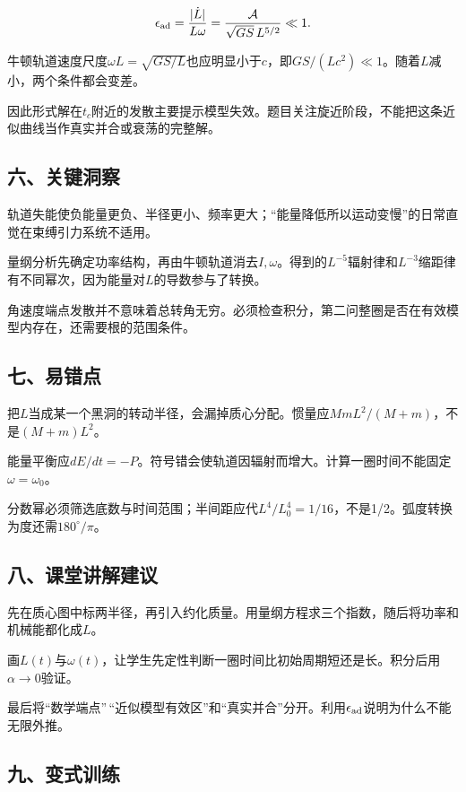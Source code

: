 \documentclass[12pt,a4paper,fontset=fandol]{ctexart}
\begin{document}
\[
\epsilon_{\rm ad}
=\frac{|\dot L|}{L\omega}
=\frac{\mathcal A}{\sqrt{GS}\,L^{5/2}}\ll1.
\]

牛顿轨道速度尺度\(\omega L=\sqrt{GS/L}\)也应明显小于\(c\)，即\(GS/(Lc^2)\ll1\)。随着\(L\)减小，两个条件都会变差。

因此形式解在\(t_c\)附近的发散主要提示模型失效。题目关注旋近阶段，不能把这条近似曲线当作真实并合或衰荡的完整解。

\subsection{六、关键洞察}\label{ux516dux5173ux952eux6d1eux5bdf-6}

轨道失能使负能量更负、半径更小、频率更大；``能量降低所以运动变慢''的日常直觉在束缚引力系统不适用。

量纲分析先确定功率结构，再由牛顿轨道消去\(I,\omega\)。得到的\(L^{-5}\)辐射律和\(L^{-3}\)缩距律有不同幂次，因为能量对\(L\)的导数参与了转换。

角速度端点发散并不意味着总转角无穷。必须检查积分，第二问整圈是否在有效模型内存在，还需要根的范围条件。

\subsection{七、易错点}\label{ux4e03ux6613ux9519ux70b9-6}

把\(L\)当成某一个黑洞的转动半径，会漏掉质心分配。惯量应\(MmL^2/(M+m)\)，不是\((M+m)L^2\)。

能量平衡应\(dE/dt=-P\)。符号错会使轨道因辐射而增大。计算一圈时间不能固定\(\omega=\omega_0\)。

分数幂必须筛选底数与时间范围；半间距应代\(L^4/L_0^4=1/16\)，不是1/2。弧度转换为度还需\(180^\circ/\pi\)。

\subsection{八、课堂讲解建议}\label{ux516bux8bfeux5802ux8bb2ux89e3ux5efaux8bae-6}

先在质心图中标两半径，再引入约化质量。用量纲方程求三个指数，随后将功率和机械能都化成\(L\)。

画\(L(t)\)与\(\omega(t)\)，让学生先定性判断一圈时间比初始周期短还是长。积分后用\(\alpha\to0\)验证。

最后将``数学端点''\,``近似模型有效区''和``真实并合''分开。利用\(\epsilon_{\rm ad}\)说明为什么不能无限外推。

\subsection{九、变式训练}\label{ux4e5dux53d8ux5f0fux8badux7ec3-6}
\end{document}
